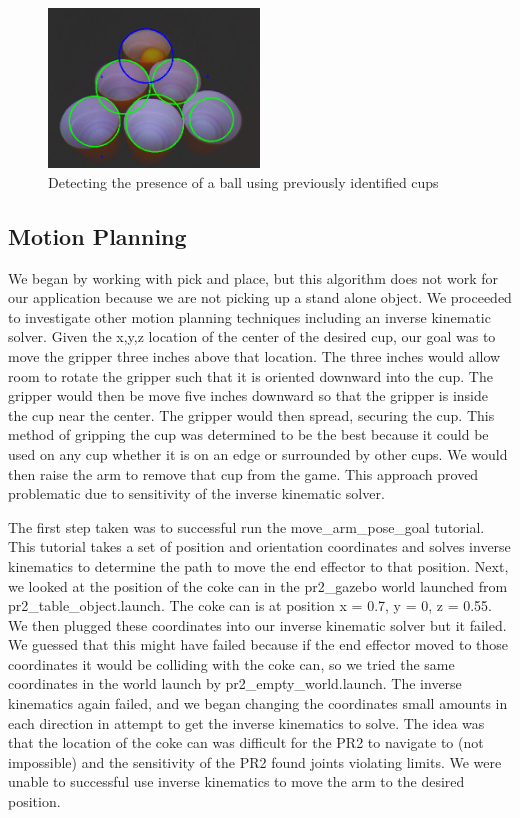 \documentclass[letterpaper, 10 pt, conference]{ieeeconf}  %
\begin{document}
\begin{figure}[thpb]
      \centering
	  \includegraphics[width = 0.5\textwidth]{ball_detected_6}
      \caption{Detecting the presence of a ball using previously identified cups}
      \label{fig:ball_detected}
\end{figure}

\subsection{Motion Planning}

We began by working with pick and place, but this algorithm does not work for our application because we are not picking up a stand alone object. We proceeded to investigate other motion planning techniques including an inverse kinematic solver. Given the x,y,z location of the center of the desired cup, our goal was to move the gripper three inches above that location. The three inches would allow room to rotate the gripper such that it is oriented downward into the cup. The gripper would then be move five inches downward so that the gripper is inside the cup near the center. The gripper would then spread, securing the cup. This method of gripping the cup was determined to be the best because it could be used on any cup whether it is on an edge or surrounded by other cups. We would then raise the arm to remove that cup from the game.  This approach proved problematic due to sensitivity of the inverse kinematic solver. 

The first step taken was to successful run the move\_arm\_pose\_goal tutorial. This tutorial takes a set of position and orientation coordinates and solves inverse kinematics to determine the path to move the end effector to that position. Next, we looked at the position of the coke can in the pr2\_gazebo world launched from pr2\_table\_object.launch. The coke can is at position x = 0.7, y = 0, z = 0.55. We then plugged these coordinates into our inverse kinematic solver but it failed. We guessed that this might have failed because if the end effector moved to those coordinates it would be colliding with the coke can, so we tried the same coordinates in the world launch by pr2\_empty\_world.launch. The inverse kinematics again failed, and we began changing the coordinates small amounts in each direction in attempt to get the inverse kinematics to solve. The idea was that the location of the coke can was difficult for the PR2 to navigate to (not impossible) and the sensitivity of the PR2 found joints violating limits. We were unable to successful use inverse kinematics to move the arm to the desired position.
\end{document}
